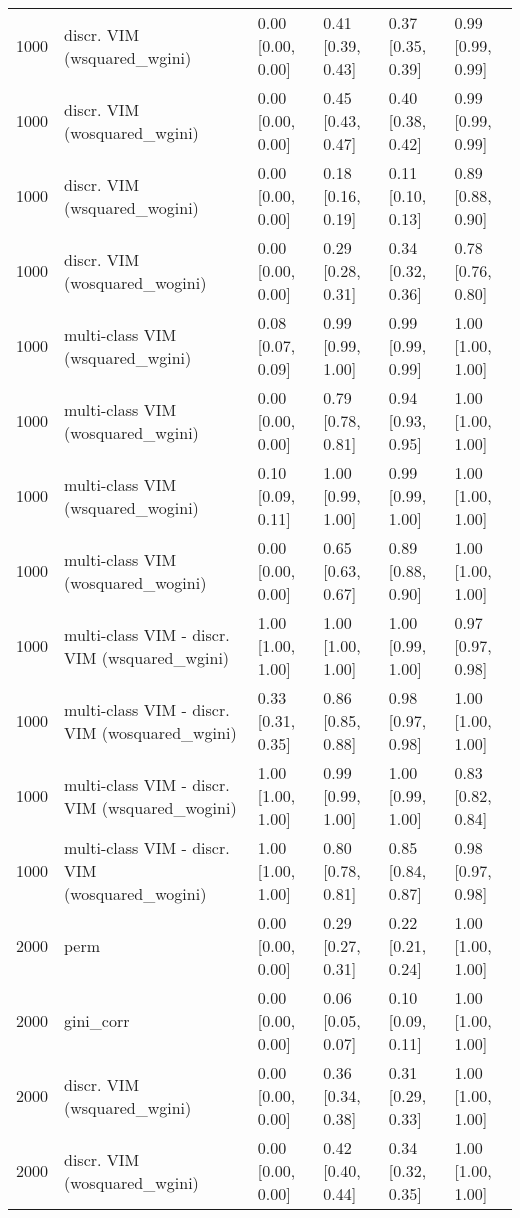 \begin{table}[ht]
\begin{tabular}{rlllll}
  1000 & discr. VIM (wsquared\_wgini) & 0.00 [0.00, 0.00] & 0.41 [0.39, 0.43] & 0.37 [0.35, 0.39] & 0.99 [0.99, 0.99] \\ 
  1000 & discr. VIM (wosquared\_wgini) & 0.00 [0.00, 0.00] & 0.45 [0.43, 0.47] & 0.40 [0.38, 0.42] & 0.99 [0.99, 0.99] \\ 
  1000 & discr. VIM (wsquared\_wogini) & 0.00 [0.00, 0.00] & 0.18 [0.16, 0.19] & 0.11 [0.10, 0.13] & 0.89 [0.88, 0.90] \\ 
  1000 & discr. VIM (wosquared\_wogini) & 0.00 [0.00, 0.00] & 0.29 [0.28, 0.31] & 0.34 [0.32, 0.36] & 0.78 [0.76, 0.80] \\ 
  1000 & multi-class VIM (wsquared\_wgini) & 0.08 [0.07, 0.09] & 0.99 [0.99, 1.00] & 0.99 [0.99, 0.99] & 1.00 [1.00, 1.00] \\ 
  1000 & multi-class VIM (wosquared\_wgini) & 0.00 [0.00, 0.00] & 0.79 [0.78, 0.81] & 0.94 [0.93, 0.95] & 1.00 [1.00, 1.00] \\ 
  1000 & multi-class VIM (wsquared\_wogini) & 0.10 [0.09, 0.11] & 1.00 [0.99, 1.00] & 0.99 [0.99, 1.00] & 1.00 [1.00, 1.00] \\ 
  1000 & multi-class VIM (wosquared\_wogini) & 0.00 [0.00, 0.00] & 0.65 [0.63, 0.67] & 0.89 [0.88, 0.90] & 1.00 [1.00, 1.00] \\ 
  1000 & multi-class VIM - discr. VIM (wsquared\_wgini) & 1.00 [1.00, 1.00] & 1.00 [1.00, 1.00] & 1.00 [0.99, 1.00] & 0.97 [0.97, 0.98] \\ 
  1000 & multi-class VIM - discr. VIM (wosquared\_wgini) & 0.33 [0.31, 0.35] & 0.86 [0.85, 0.88] & 0.98 [0.97, 0.98] & 1.00 [1.00, 1.00] \\ 
  1000 & multi-class VIM - discr. VIM (wsquared\_wogini) & 1.00 [1.00, 1.00] & 0.99 [0.99, 1.00] & 1.00 [0.99, 1.00] & 0.83 [0.82, 0.84] \\ 
  1000 & multi-class VIM - discr. VIM (wosquared\_wogini) & 1.00 [1.00, 1.00] & 0.80 [0.78, 0.81] & 0.85 [0.84, 0.87] & 0.98 [0.97, 0.98] \\ 
   \hline 2000 & perm & 0.00 [0.00, 0.00] & 0.29 [0.27, 0.31] & 0.22 [0.21, 0.24] & 1.00 [1.00, 1.00] \\ 
  2000 & gini\_corr & 0.00 [0.00, 0.00] & 0.06 [0.05, 0.07] & 0.10 [0.09, 0.11] & 1.00 [1.00, 1.00] \\ 
  2000 & discr. VIM (wsquared\_wgini) & 0.00 [0.00, 0.00] & 0.36 [0.34, 0.38] & 0.31 [0.29, 0.33] & 1.00 [1.00, 1.00] \\ 
  2000 & discr. VIM (wosquared\_wgini) & 0.00 [0.00, 0.00] & 0.42 [0.40, 0.44] & 0.34 [0.32, 0.35] & 1.00 [1.00, 1.00] \\ 

\end{tabular}
\end{table}
